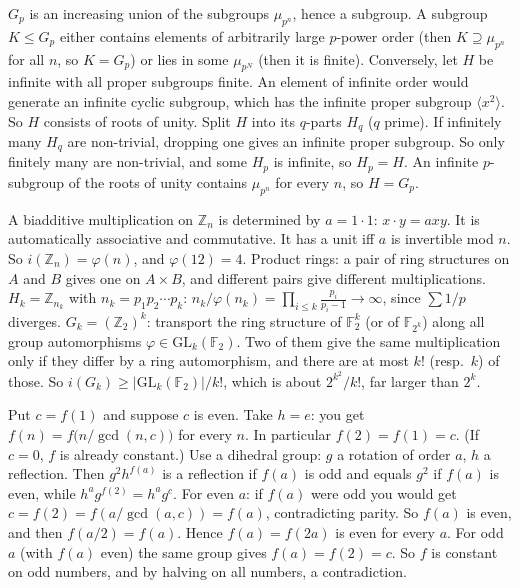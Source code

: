 \documentclass[11pt,a4paper]{article}
\begin{document}

 $G_p$ is an increasing union of the subgroups $\mu_{p^n}$, hence a subgroup. A subgroup $K\le G_p$ either contains elements of arbitrarily large $p$-power order (then $K\supseteq\mu_{p^n}$ for all $n$, so $K=G_p$) or lies in some $\mu_{p^N}$ (then it is finite).
 Conversely, let $H$ be infinite with all proper subgroups finite. An element of infinite order would generate an infinite cyclic subgroup, which has the infinite proper subgroup $\langle x^2\rangle$. So $H$ consists of roots of unity.
 Split $H$ into its $q$-parts $H_q$ ($q$ prime). If infinitely many $H_q$ are non-trivial, dropping one gives an infinite proper subgroup. So only finitely many are non-trivial, and some $H_p$ is infinite, so $H_p=H$. An infinite $p$-subgroup of the roots of unity contains $\mu_{p^n}$ for every $n$, so $H=G_p$.

 A biadditive multiplication on $\mathbb Z_n$ is determined by $a=1\cdot1$: $x\cdot y=axy$. It is automatically associative and commutative. It has a unit iff $a$ is invertible mod $n$. So $i(\mathbb Z_n)=\varphi(n)$, and $\varphi(12)=4$.
 Product rings: a pair of ring structures on $A$ and $B$ gives one on $A\times B$, and different pairs give different multiplications.
 $H_k=\mathbb Z_{n_k}$ with $n_k=p_1p_2\cdots p_k$: $n_k/\varphi(n_k)=\prod_{i\le k}\frac{p_i}{p_i-1}\to\infty$, since $\sum1/p$ diverges.
 $G_k=(\mathbb Z_2)^k$: transport the ring structure of $\mathbb F_2^k$ (or of $\mathbb F_{2^k}$) along all group automorphisms $\varphi\in\mathrm{GL}_k(\mathbb F_2)$. Two of them give the same multiplication only if they differ by a ring automorphism, and there are at most $k!$ (resp.\ $k$) of those. So $i(G_k)\ge|\mathrm{GL}_k(\mathbb F_2)|/k!$, which is about $2^{k^2}/k!$, far larger than $2^k$.

 Put $c=f(1)$ and suppose $c$ is even. Take $h=e$: you get $f(n)=f\bigl(n/\gcd(n,c)\bigr)$ for every $n$. In particular $f(2)=f(1)=c$. (If $c=0$, $f$ is already constant.)
 Use a dihedral group: $g$ a rotation of order $a$, $h$ a reflection. Then $g^2h^{f(a)}$ is a reflection if $f(a)$ is odd and equals $g^2$ if $f(a)$ is even, while $h^ag^{f(2)}=h^ag^c$.
 For even $a$: if $f(a)$ were odd you would get $c=f(2)=f(a/\gcd(a,c))=f(a)$, contradicting parity. So $f(a)$ is even, and then $f(a/2)=f(a)$. Hence $f(a)=f(2a)$ is even for every $a$.
 For odd $a$ (with $f(a)$ even) the same group gives $f(a)=f(2)=c$. So $f$ is constant on odd numbers, and by halving on all numbers, a contradiction.
\end{document}
